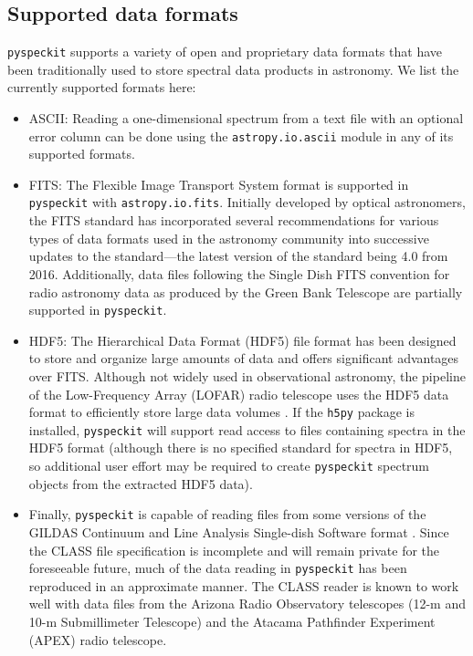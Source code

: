 \documentclass[twocolumn]{aastex62}
\newcommand{\pyspeckit}{\texttt{pyspeckit}\xspace}
\begin{document}
\subsection{Supported data formats}

\pyspeckit supports a variety of open and proprietary data formats that have
been traditionally used to store spectral data products in astronomy. 
We list the currently supported formats here:

\begin{itemize}
    \item ASCII: Reading a one-dimensional spectrum from a text file with an optional
        error column can
be done using the \texttt{astropy.io.ascii} module in any of its supported
formats.  
    \item FITS: The Flexible Image Transport System \citep[FITS;][]{Pence2010a} format is
supported in \pyspeckit with \texttt{astropy.io.fits}.  Initially developed
by optical astronomers, the FITS standard has incorporated several
recommendations for various types of data formats used in the astronomy
community into successive updates to the standard---the latest version of the
standard being 4.0 from 2016.  Additionally, data files following the Single
Dish FITS \citep[SDFITS;][]{Garwood2000a} convention for radio astronomy data as
produced by the Green Bank Telescope are partially supported in \pyspeckit.
    \item HDF5: The Hierarchical Data Format (HDF5) file format has been
        designed to store and organize large amounts of data and offers
        significant advantages over FITS\@.  Although not widely used in
        observational astronomy, the pipeline of the Low-Frequency Array
        (LOFAR) radio telescope uses the HDF5 data format to efficiently store
        large data volumes \citep{Alexov2012a}.  If the \texttt{h5py} package
        is installed, \pyspeckit will support read access to files containing
        spectra in the HDF5 format (although there is no specified standard for
        spectra in HDF5, so additional user effort may be required to create
        \pyspeckit spectrum objects from the extracted HDF5 data).
    \item Finally, \pyspeckit is capable of reading files from some versions of
        the GILDAS Continuum and Line Analysis Single-dish Software format
        \citep[CLASS;][]{Gildas-Team2013a}.  Since the CLASS file specification
        is incomplete and will remain private for the foreseeable future, much
        of the data reading in \pyspeckit has been reproduced in an approximate
        manner.  The CLASS reader is known to work well with data files from
        the Arizona Radio Observatory telescopes (12-m and 10-m Submillimeter
        Telescope) and the Atacama Pathfinder Experiment (APEX) radio
        telescope.
\end{itemize}
\end{document}
